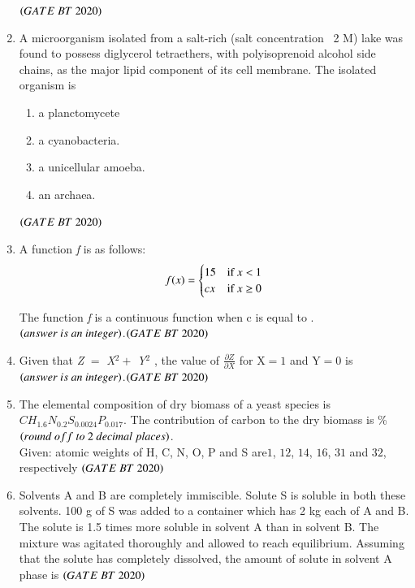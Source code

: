 \documentclass[journal,12pt,onecolumn]{IEEEtran}
\theoremstyle{remark}
\begin{document}
\begin{enumerate}[label=Q\arabic*:]
\begin{multicols}{2}
\begin{enumerate}
\end{enumerate} 
\end{multicols}
\hfill$\brak{GATE\ BT\ 2020}$

\item A microorganism isolated from a salt-rich (salt concentration ~2 M) lake was
found to possess diglycerol tetraethers, with polyisoprenoid alcohol side chains, as the major lipid component of its cell membrane. The isolated organism is
\begin{multicols}{2}
\begin{enumerate}

\item\;a planctomycete
\item\;a cyanobacteria.
\item\;a unicellular amoeba.
\item\;an archaea.
\end{enumerate}
\end{multicols}
\hfill$\brak{GATE\ BT\ 2020}$

\item A function \textit{f} is as follows:\\
\[
f(x) =
\begin{cases}
$15$  & \text{if }x< $ 1$ \\
cx  & \text{if } x \geq $ 0$
\end{cases}
\]

The function \textit{f} is a continuous function when c is equal to .
$\brak{answer\ is\ an \ integer}$.\hfill$\brak{GATE\ BT\ 2020}$

\item Given that \textit{Z }$=$\textit{ X}$^2 +$ \textit{Y}$^2$ , the value of \(\frac{\partial Z}{\partial X}\) for  X$=1 $ and Y$=0 $ is  $\brak{answer\ is\ an \ integer}$.\hfill$\brak{GATE\ BT\ 2020}$


\item The elemental composition of dry biomass of a yeast species is\\
$CH_{1.6}N_{0.2}S_{0.0024}P_{0.017}$. The contribution of carbon to the dry biomass is   \% $\brak{round \ off \ to\ 2 \ decimal\ places}$.\\
Given: atomic weights of H, C, N, O, P and S are$1$, $12$, $14$, $16$, $31$ and $32$, respectively \hfill$\brak{GATE\ BT\ 2020}$

\item Solvents A and B are completely immiscible. Solute S is soluble in both these solvents. 100 g of S was added to a container which has 2 kg each of A and B. The solute is 1.5 times more soluble in solvent A than in solvent B. The mixture was agitated thoroughly and allowed to reach equilibrium. Assuming that the solute has completely dissolved, the amount of solute in solvent A phase is   
\hfill$\brak{GATE\ BT\ 2020}$\\


\end{enumerate}
\end{document}
